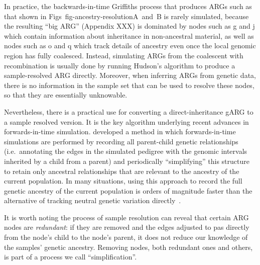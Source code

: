 \documentclass{article}
\begin{document}
In practice, the backwards-in-time Griffiths process that produces
ARGs such as that shown in Figs~{fig-ancestry-resolution}A~and~B
is rarely simulated, because the resulting ``big ARG'' (Appendix XXX) is
dominated by nodes such as \textsf{g} and \textsf{j} which contain information
about inheritance in non-ancestral material, as well as nodes such as
\textsf{o} and \textsf{q} which track details of ancestry even once the
local genomic region has fully coalesced. Instead, simulating
ARGs from the coalescent with recombination is usually done by
running Hudson's algorithm to produce a sample-resolved ARG directly.
Moreover, when inferring ARGs from genetic data, there is no information
in the sample set that can be used to resolve these nodes, so that they
are essentially unknowable.

Nevertheless, there is a practical use for converting a direct-inheritance
gARG to a sample resolved version. It is the key algorithm underlying recent
advances in forwards-in-time simulation.
\cite{kelleher2018efficient} developed a method in which forwards-in-time
simulations are performed by recording all parent-child genetic relationships
(i.e.~annotating the edges in the simulated pedigree with the genomic
intervals inherited by a child from a parent) and periodically ``simplifying''
this structure to retain only ancestral relationships that are relevant
to the ancestry of the current population. In many situations, using this approach to
record the full genetic ancestry of the current population is orders of magnitude faster
than the alternative of tracking neutral genetic variation directly~\citep{kelleher2018efficient,haller2018tree}.

It is worth noting the process of sample resolution can reveal that certain ARG
nodes are \emph{redundant}: if they are removed and the edges adjusted to
pas directly from the node's child to the node's parent, it does not reduce our
knowledge of the samples' genetic ancestry. Removing nodes,
both redundant ones and others, is part of a process we call
``simplification''.
\end{document}
